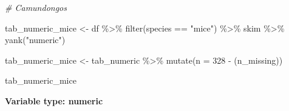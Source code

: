 \documentclass[
]{article}
\newenvironment{Shaded}{\begin{snugshade}}{\end{snugshade}}
\newcommand{\AttributeTok}[1]{\textcolor[rgb]{0.77,0.63,0.00}{#1}}
\newcommand{\CommentTok}[1]{\textcolor[rgb]{0.56,0.35,0.01}{\textit{#1}}}
\newcommand{\DecValTok}[1]{\textcolor[rgb]{0.00,0.00,0.81}{#1}}
\newcommand{\FunctionTok}[1]{\textcolor[rgb]{0.00,0.00,0.00}{#1}}
\newcommand{\NormalTok}[1]{#1}
\newcommand{\OtherTok}[1]{\textcolor[rgb]{0.56,0.35,0.01}{#1}}
\newcommand{\SpecialCharTok}[1]{\textcolor[rgb]{0.00,0.00,0.00}{#1}}
\newcommand{\StringTok}[1]{\textcolor[rgb]{0.31,0.60,0.02}{#1}}
\begin{document}
\begin{Shaded}
\begin{Highlighting}[]
\CommentTok{\# Camundongos}


\NormalTok{tab\_numeric\_mice }\OtherTok{\textless{}{-}}\NormalTok{ df }\SpecialCharTok{\%\textgreater{}\%} 
  \FunctionTok{filter}\NormalTok{(species }\SpecialCharTok{==} \StringTok{"mice"}\NormalTok{) }\SpecialCharTok{\%\textgreater{}\%} 
\NormalTok{  skim }\SpecialCharTok{\%\textgreater{}\%}
  \FunctionTok{yank}\NormalTok{(}\StringTok{"numeric"}\NormalTok{)}

\NormalTok{tab\_numeric\_mice }\OtherTok{\textless{}{-}}\NormalTok{ tab\_numeric }\SpecialCharTok{\%\textgreater{}\%} 
  \FunctionTok{mutate}\NormalTok{(}\AttributeTok{n =} \DecValTok{328} \SpecialCharTok{{-}}\NormalTok{ (n\_missing))}

\NormalTok{tab\_numeric\_mice}
\end{Highlighting}
\end{Shaded}

\textbf{Variable type: numeric}
\end{document}

